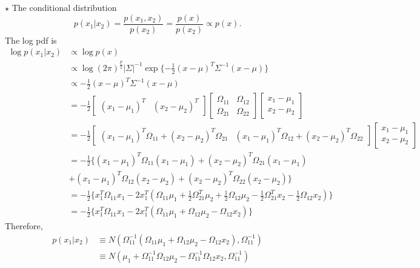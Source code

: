 \documentclass[11pt]{article}
\newcommand{\jie}{$\star$ }
\newcommand{\half}{\frac{1}{2}}
\begin{document}
\begin{enumerate}[(A)]
\bigskip

\jie
The conditional distribution
$$p(x_1|x_2) = \frac{p(x_1,x_2)}{p(x_2)} = \frac{p(x)}{p(x_2)} \propto p(x).$$
The log pdf is
\begin{align*}
    \log p(x_1|x_2) &\propto \log p(x) \\
    &\propto \log (2\pi)^{\frac{p}{2}} |\Sigma|^{-1} \exp \{ -\half (x-\mu)^T \Sigma^{-1} (x-\mu)\} \\
    &\propto -\half (x-\mu)^T\Sigma^{-1} (x-\mu) \\
    &= -\half \begin{bmatrix}
    (x_1-\mu_1)^T & (x_2-\mu_2)^T
    \end{bmatrix}
    \begin{bmatrix}
    \Omega_{11} & \Omega_{12} \\
    \Omega_{21} & \Omega_{22}
    \end{bmatrix}
    \begin{bmatrix}
    x_1-\mu_1 \\
    x_2-\mu_2
    \end{bmatrix} \\
    &= -\half \begin{bmatrix}
    (x_1-\mu_1)^T\Omega_{11} + (x_2-\mu_2)^T\Omega_{21} & (x_1-\mu_1)^T\Omega_{12} + (x_2-\mu_2)^T\Omega_{22}
    \end{bmatrix}
    \begin{bmatrix}
    x_1-\mu_1 \\
    x_2-\mu_2
    \end{bmatrix}\\
    &= -\half \{ (x_1-\mu_1)^T\Omega_{11}(x_1-\mu_1) + (x_2-\mu_2)^T\Omega_{21}(x_1-\mu_1) \\&+ (x_1-\mu_1)^T\Omega_{12}(x_2-\mu_2) + (x_2-\mu_2)^T\Omega_{22}(x_2-\mu_2) \} \\
    &= -\half \{ x_1^T \Omega_{11} x_1 -  2x_1^T (\Omega_{11} \mu_1 + \half \Omega_{21}^T \mu_2 + \half \Omega_{12}\mu_2 - \half \Omega_{21}^T x_2 - \half \Omega_{12}x_2) \} \\
    &= -\half \{ x_1^T \Omega_{11} x_1 -  2x_1^T (\Omega_{11} \mu_1 + \Omega_{12} \mu_2 - \Omega_{12} x_2) \} 
\end{align*}
Therefore,
\begin{align*}
    p(x_1|x_2) &\equiv N(\Omega_{11}^{-1} (\Omega_{11} \mu_1 + \Omega_{12} \mu_2 - \Omega_{12} x_2), \Omega_{11}^{-1}) \\
    &\equiv N(\mu_1 + \Omega_{11}^{-1}\Omega_{12} \mu_2 - \Omega_{11}^{-1}\Omega_{12} x_2, \Omega_{11}^{-1}) 
\end{align*}


\bigskip 

\end{enumerate}
\end{document}
